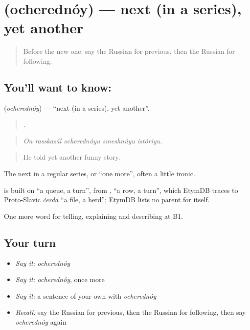 \section[\texorpdfstring{\ru{очередной} (ocherednóy)}{очередной (ocherednóy)}]{ (ocherednóy) — next (in a series), yet another}

\label{lesson:RU-C277-ocherednoy}



\begin{quote}
Before the new one: say the Russian for previous, then the Russian for following.
\end{quote}

\subsection*{You'll want to know: }
\textbf{} (\emph{ocherednóy}) — \textquotedblleft{}next (in a series), yet another\textquotedblright{}.

\begin{quote}
    .
\end{quote}

\begin{quote}
\emph{On rasskazál ocherednúyu smeshnúyu istóriyu.}
\end{quote}

\begin{quote}
He told yet another funny story.
\end{quote}

The next in a regular series, or \textquotedblleft{}one more\textquotedblright{}, often a little ironic.

\begin{cousinweb}
\emph{} is built on \emph{} \textquotedblleft{}a queue, a turn\textquotedblright{}, from \emph{}, \emph{} \textquotedblleft{}a row, a turn\textquotedblright{}, which EtymDB traces to Proto-Slavic \emph{čerda} \textquotedblleft{}a file, a herd\textquotedblright{}; EtymDB lists no parent for \emph{} itself.
\end{cousinweb}

\begin{grammarlens}[title={What you've built}]
One more word for telling, explaining and describing at B1.
\end{grammarlens}

\subsection*{Your turn}
\begin{itemize}
\raggedright
  \item \emph{Say it:} \emph{ocherednóy}
  \item \emph{Say it:} \emph{ocherednóy}, once more
  \item \emph{Say it:} a sentence of your own with \emph{ocherednóy}
  \item \emph{Recall:} say the Russian for previous, then the Russian for following, then say \emph{ocherednóy} again
\end{itemize}

